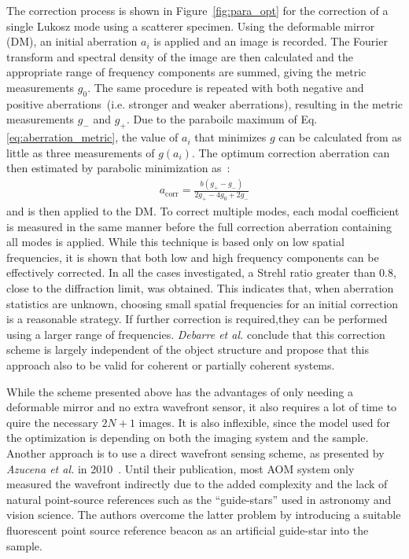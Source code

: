 The correction process is shown in Figure~\ref{fig:para_opt} for the correction of a single Lukosz mode using a scatterer specimen. Using the deformable mirror (DM), an initial aberration $a_i$ is applied and an image is recorded. The Fourier transform and spectral density of the image are then calculated and the appropriate range of frequency components are summed, giving the metric measurements $g_0$. The same procedure is repeated with both negative and positive aberrations~(i.e. stronger and weaker aberrations), resulting in the metric measurements $g_-$ and  $g_+$. Due to the paraboilc maximum of Eq. \eqref{eq:aberration_metric}, the value of $a_i$ that minimizes $g$ can be calculated from as little as three measurements of $g(a_i)$. The optimum correction aberration can then estimated by parabolic minimization as~\cite{wide_parabolic_optimization}:
\begin{align}
	a_\text{corr} = \frac{b(g_+ - g_-)}{2g_+ - 4g_0 + 2g_-}
\end{align}
and is then applied to the DM. To correct multiple modes, each modal coefficient is measured in the same manner before the full correction aberration containing all modes is applied. While this technique is based only on low spatial frequencies, it is shown that both low and high frequency components can be effectively corrected. In all the cases investigated, a Strehl ratio greater than 0.8, close to the diffraction limit, was obtained. This indicates that, when aberration statistics are unknown, choosing small spatial frequencies for an initial correction is a reasonable strategy. If further correction is required,they can be performed using a larger range of frequencies. \emph{Debarre et al.} conclude that this correction scheme is largely independent of the object structure and propose that this approach also to be valid for coherent or partially coherent systems.

While the scheme presented above has the advantages of only needing a deformable mirror and no extra wavefront sensor, it also requires a lot of time to quire the necessary $2N+1$ images. It is also inflexible, since the model used for the optimization is depending on both the imaging system and the sample. Another approach is to use a direct wavefront sensing scheme, as presented by \emph{Azucena et al.} in 2010~\cite{wide_fluorescence_guide_star}. Until their publication, most AOM system only measured the wavefront indirectly due to the added complexity and the lack of natural point-source references such as the ``guide-stars'' used in astronomy and vision science. The authors overcome the latter problem by introducing a suitable fluorescent point source reference beacon as an artificial guide-star into the sample. 

